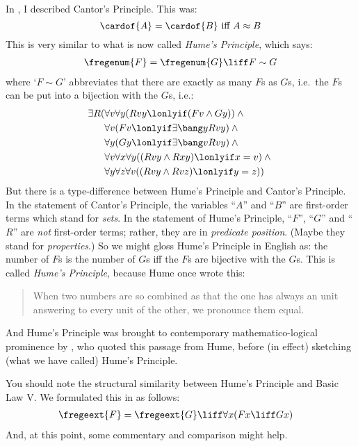 \documentclass[../../../include/open-logic-section]{subfiles}
\begin{document}
In , I described Cantor's Principle. This was:
	$$\cardof{A} = \cardof{B}\text{ iff }A \approx B$$
This is very similar to what is now called \emph{Hume's Principle}, which says:
\begin{align*}
	\fregenum{F} = \fregenum{G} \liff F \sim G
\end{align*}
where `$F \sim G$' abbreviates that there are exactly as many $F$s as $G$s, i.e.\ the $F$s can be put into a bijection with the $G$s, i.e.:
	\begin{align*}
			\exists R(&\forall v\forall y(Rvy \lonlyif (Fv \land Gy)) \land {}\\
							&\forall v(Fv \lonlyif \exists \bang y Rvy) \land {}\\
							&\forall y(Gy \lonlyif \exists \bang v Rvy) \land{}\\
							&\forall v\forall x \forall y((Rvy \land Rxy) \lonlyif x = v) \land{}\\
							&\forall y \forall z \forall v((Rvy \land Rvz) \lonlyif y = z))
	\end{align*}
But there is a type-difference between Hume's Principle and Cantor's Principle. In the statement of Cantor's Principle, the variables ``$A$'' and ``$B$'' are first-order terms which stand for \emph{sets}. In the statement of Hume's Principle, ``$F$'', ``$G$'' and ``$R$'' are \emph{not} first-order terms; rather, they are in \emph{predicate position}. (Maybe they stand for \emph{properties}.) So we might gloss Hume's Principle in English as: the number of $F$s is the number of $G$s iff the $F$s are bijective with the $G$s. This is called \emph{Hume's Principle}, because Hume once wrote this:
\begin{quote}
	When two numbers are so combined as that the one has always an unit answering to every unit of the other, we pronounce them equal. \citep[Pt.III Bk.1 \S1]{Hume1740}
\end{quote}
And Hume's Principle was brought to contemporary mathematico-logical prominence by \citet[\S63]{Frege1884}, who quoted this passage from Hume, before (in effect) sketching (what we have called) Hume's Principle. 

You should note the structural similarity between Hume's Principle and Basic Law V. We formulated this in  as follows:
\begin{align*}
	\fregeext{F} = \fregeext{G} &\liff \forall x(Fx \liff Gx)
\end{align*}
And, at this point, some commentary and comparison might help. 
\end{document}
